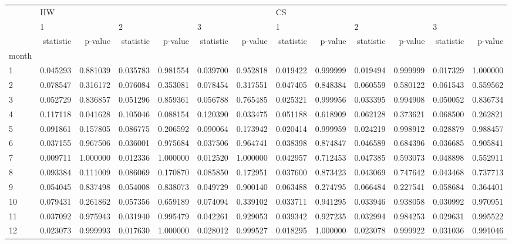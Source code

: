 \begin{tabular}{lrrrrrrrrrrrr}
\toprule
{} & \multicolumn{6}{l}{HW} & \multicolumn{6}{l}{CS} \\
{} & \multicolumn{2}{l}{1} & \multicolumn{2}{l}{2} & \multicolumn{2}{l}{3} & \multicolumn{2}{l}{1} & \multicolumn{2}{l}{2} & \multicolumn{2}{l}{3} \\
{} & statistic &   p-value & statistic &   p-value & statistic &   p-value & statistic &   p-value & statistic &   p-value & statistic &   p-value \\
month &           &           &           &           &           &           &           &           &           &           &           &           \\
\midrule
1     &  0.045293 &  0.881039 &  0.035783 &  0.981554 &  0.039700 &  0.952818 &  0.019422 &  0.999999 &  0.019494 &  0.999999 &  0.017329 &  1.000000 \\
2     &  0.078547 &  0.316172 &  0.076084 &  0.353081 &  0.078454 &  0.317551 &  0.047405 &  0.848384 &  0.060559 &  0.580122 &  0.061543 &  0.559562 \\
3     &  0.052729 &  0.836857 &  0.051296 &  0.859361 &  0.056788 &  0.765485 &  0.025321 &  0.999956 &  0.033395 &  0.994908 &  0.050052 &  0.836734 \\
4     &  0.117118 &  0.041628 &  0.105046 &  0.088154 &  0.120390 &  0.033475 &  0.051188 &  0.618909 &  0.062128 &  0.373621 &  0.068500 &  0.262821 \\
5     &  0.091861 &  0.157805 &  0.086775 &  0.206592 &  0.090064 &  0.173942 &  0.020414 &  0.999959 &  0.024219 &  0.998912 &  0.028879 &  0.988457 \\
6     &  0.037155 &  0.967506 &  0.036001 &  0.975684 &  0.037506 &  0.964741 &  0.038398 &  0.874847 &  0.046589 &  0.684396 &  0.036685 &  0.905841 \\
7     &  0.009711 &  1.000000 &  0.012336 &  1.000000 &  0.012520 &  1.000000 &  0.042957 &  0.712453 &  0.047385 &  0.593073 &  0.048898 &  0.552911 \\
8     &  0.093384 &  0.111009 &  0.086069 &  0.170870 &  0.085850 &  0.172951 &  0.037600 &  0.873423 &  0.043069 &  0.747642 &  0.043468 &  0.737713 \\
9     &  0.054045 &  0.837498 &  0.054008 &  0.838073 &  0.049729 &  0.900140 &  0.063488 &  0.274795 &  0.066484 &  0.227541 &  0.058684 &  0.364401 \\
10    &  0.079431 &  0.261862 &  0.057356 &  0.659189 &  0.074094 &  0.339102 &  0.033711 &  0.941295 &  0.033946 &  0.938058 &  0.030992 &  0.970951 \\
11    &  0.037092 &  0.975943 &  0.031940 &  0.995479 &  0.042261 &  0.929053 &  0.039342 &  0.927235 &  0.032994 &  0.984253 &  0.029631 &  0.995522 \\
12    &  0.023073 &  0.999993 &  0.017630 &  1.000000 &  0.028012 &  0.999527 &  0.018295 &  1.000000 &  0.023078 &  0.999922 &  0.031036 &  0.991046 \\
\bottomrule
\end{tabular}
